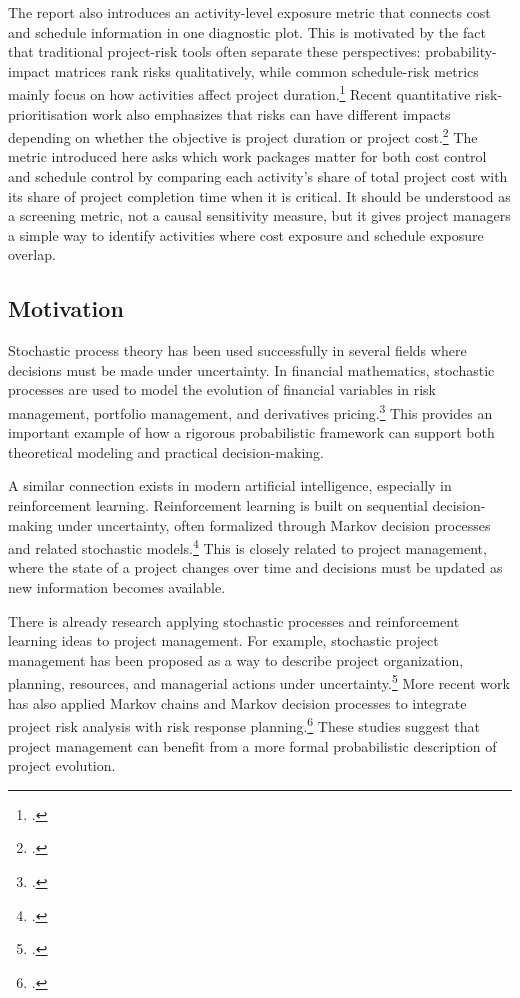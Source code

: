 \documentclass[11pt,a4paper]{article}
\newcommand{\1}{\mathbf{1}}
\theoremstyle{definition}
\theoremstyle{plain}
\theoremstyle{remark}
\numberwithin{equation}{section}
\begin{document}
The report also introduces an activity-level exposure metric that connects cost and schedule information in one diagnostic plot. This is motivated by the fact that traditional project-risk tools often separate these perspectives: probability-impact matrices rank risks qualitatively, while common schedule-risk metrics mainly focus on how activities affect project duration.\footcite{vanhoucke2011scheduleRiskAnalysisSensitivity} Recent quantitative risk-prioritisation work also emphasizes that risks can have different impacts depending on whether the objective is project duration or project cost.\footcite{acebes2024beyondProbabilityImpactMatrices} The metric introduced here asks which work packages matter for both cost control and schedule control by comparing each activity's share of total project cost with its share of project completion time when it is critical. It should be understood as a screening metric, not a causal sensitivity measure, but it gives project managers a simple way to identify activities where cost exposure and schedule exposure overlap.


\subsection{Motivation}

Stochastic process theory has been used successfully in several fields where decisions must be made under uncertainty. In financial mathematics, stochastic processes are used to model the evolution of financial variables in risk management, portfolio management, and derivatives pricing.\footcite{meucci2009review} This provides an important example of how a rigorous probabilistic framework can support both theoretical modeling and practical decision-making.

A similar connection exists in modern artificial intelligence, especially in reinforcement learning. Reinforcement learning is built on sequential decision-making under uncertainty, often formalized through Markov decision processes and related stochastic models.\footcite{lattimore2020bandit} This is closely related to project management, where the state of a project changes over time and decisions must be updated as new information becomes available.

There is already research applying stochastic processes and reinforcement learning ideas to project management. For example, stochastic project management has been proposed as a way to describe project organization, planning, resources, and managerial actions under uncertainty.\footcite{oberemok2018stochastic} More recent work has also applied Markov chains and Markov decision processes to integrate project risk analysis with risk response planning.\footcite{soltan2025reinforcement} These studies suggest that project management can benefit from a more formal probabilistic description of project evolution.
\end{document}
